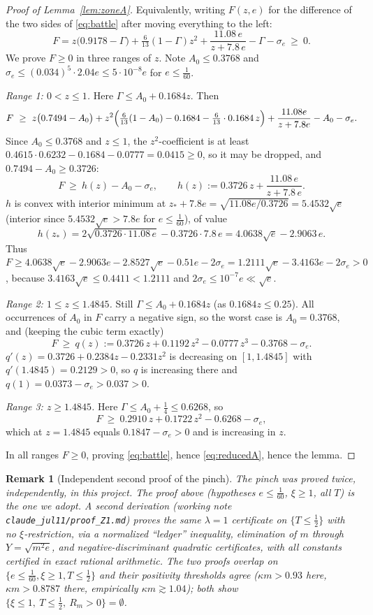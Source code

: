 \documentclass[11pt]{article}
\newtheorem{remark}[theorem]{Remark}
\begin{document}
\begin{proof}[Proof of Lemma~\ref{lem:zoneA}]
Equivalently, writing $F(z,e)$ for the difference of the two sides of
\eqref{eq:battle} after moving everything to the left:
\[
        F=z\bigl(0.9178-\Gamma\bigr)+\tfrac6{13}(1-\Gamma)z^2
        +\frac{11.08\,e}{z+7.8\,e}-\Gamma-\sigma_e\ \ge\ 0 .
\]
We prove $F\ge0$ in three ranges of $z$.  Note $A_0\le0.3768$ and
$\sigma_e\le(0.034)^5\cdot 2.04e\le5\cdot10^{-8}e$ for $e\le\tfrac1{60}$.

\emph{Range 1: $0<z\le1$.}  Here $\Gamma\le A_0+0.1684z$.  Then
\[
        F\ \ge\ z\bigl(0.7494-A_0\bigr)
        +z^2\Bigl(\tfrac6{13}(1-A_0)-0.1684-\tfrac6{13}\cdot0.1684\,z\Bigr)
        +\frac{11.08e}{z+7.8e}-A_0-\sigma_e .
\]
Since $A_0\le0.3768$ and $z\le1$, the $z^2$-coefficient is at least
$0.4615\cdot0.6232-0.1684-0.0777=0.0415\ge0$, so it may be dropped, and
$0.7494-A_0\ge0.3726$:
\[
        F\ \ge\ h(z)-A_0-\sigma_e,
        \qquad
        h(z):=0.3726\,z+\frac{11.08\,e}{z+7.8\,e} .
\]
$h$ is convex with interior minimum at $z_*+7.8e=\sqrt{11.08e/0.3726}
=5.4532\sqrt e$ (interior since $5.4532\sqrt e>7.8e$ for $e\le\tfrac1{60}$),
of value
\[
        h(z_*)=2\sqrt{0.3726\cdot11.08\,e}-0.3726\cdot7.8\,e
        =4.0638\sqrt e-2.9063\,e .
\]
Thus $F\ge4.0638\sqrt e-2.9063e-2.8527\sqrt e-0.51e-2\sigma_e
=1.2111\sqrt e-3.4163e-2\sigma_e>0$, because
$3.4163\sqrt e\le0.4411<1.2111$ and $2\sigma_e\le10^{-7}e\ll\sqrt e$.

\emph{Range 2: $1\le z\le1.4845$.}  Still $\Gamma\le A_0+0.1684z$ (as
$0.1684z\le0.25$).  All occurrences of $A_0$ in $F$ carry a negative sign, so
the worst case is $A_0=0.3768$, and (keeping the cubic term exactly)
\[
        F\ \ge\ q(z):=0.3726\,z+0.1192\,z^2-0.0777\,z^3-0.3768-\sigma_e .
\]
$q'(z)=0.3726+0.2384z-0.2331z^2$ is decreasing on $[1,1.4845]$ with
$q'(1.4845)=0.2129>0$, so $q$ is increasing there and
$q(1)=0.0373-\sigma_e>0.037>0$.

\emph{Range 3: $z\ge1.4845$.}  Here $\Gamma\le A_0+\tfrac14\le0.6268$, so
\[
        F\ \ge\ 0.2910\,z+0.1722\,z^2-0.6268-\sigma_e ,
\]
which at $z=1.4845$ equals $0.1847-\sigma_e>0$ and is increasing in $z$.

In all ranges $F\ge0$, proving \eqref{eq:battle}, hence \eqref{eq:reducedA},
hence the lemma.
\end{proof}

\begin{remark}[Independent second proof of the pinch]\label{rmk:zoneA-alt}
The pinch was proved twice, independently, in this project.  The proof above
(hypotheses $e\le\tfrac1{60}$, $\xi\ge1$, all $T$) is the one we adopt.  A
second derivation (working note \texttt{claude\_jul11/proof\_Z1.md}) proves the same
$\lambda=1$ certificate on $\{T\le\tfrac12\}$ with \emph{no} $\xi$-restriction,
via a normalized ``ledger'' inequality, elimination of $m$ through
$Y=\sqrt{m^2e}$, and negative-discriminant quadratic certificates, with all
constants certified in exact rational arithmetic.  The two proofs overlap on
$\{e\le\tfrac1{60},\xi\ge1,T\le\tfrac12\}$ and their positivity thresholds
agree ($\kappa m>0.93$ here, $\kappa m>0.8787$ there, empirically
$\kappa m\gtrsim1.04$); both show $\{\xi\le1,\ T\le\tfrac12,\ R_m>0\}=\emptyset$.
\end{remark}
\end{document}
